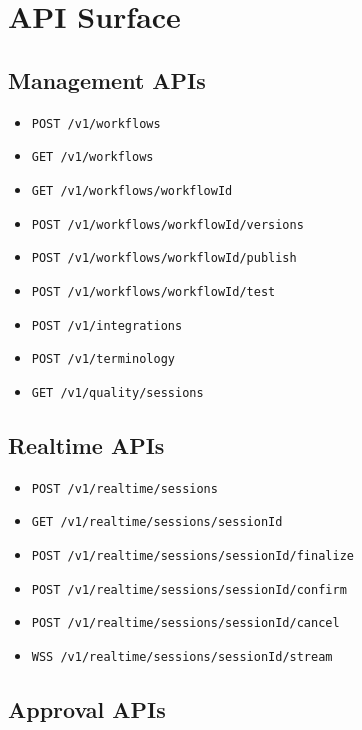 \documentclass[11pt,a4paper]{article}
\begin{document}
\section{API Surface}

\subsection{Management APIs}

\begin{itemize}
\item \texttt{POST /v1/workflows}
\item \texttt{GET /v1/workflows}
\item \texttt{GET /v1/workflows/{workflowId}}
\item \texttt{POST /v1/workflows/{workflowId}/versions}
\item \texttt{POST /v1/workflows/{workflowId}/publish}
\item \texttt{POST /v1/workflows/{workflowId}/test}
\item \texttt{POST /v1/integrations}
\item \texttt{POST /v1/terminology}
\item \texttt{GET /v1/quality/sessions}
\end{itemize}

\subsection{Realtime APIs}

\begin{itemize}
\item \texttt{POST /v1/realtime/sessions}
\item \texttt{GET /v1/realtime/sessions/{sessionId}}
\item \texttt{POST /v1/realtime/sessions/{sessionId}/finalize}
\item \texttt{POST /v1/realtime/sessions/{sessionId}/confirm}
\item \texttt{POST /v1/realtime/sessions/{sessionId}/cancel}
\item \texttt{WSS /v1/realtime/sessions/{sessionId}/stream}
\end{itemize}

\subsection{Approval APIs}
\end{document}
